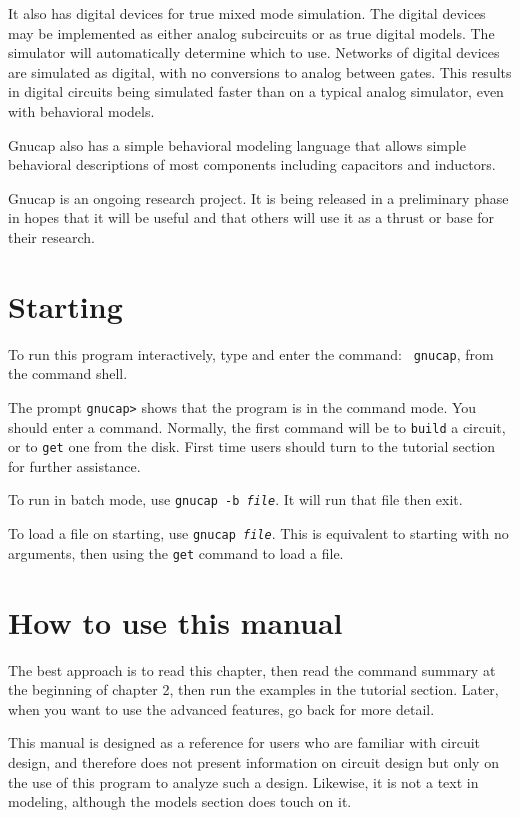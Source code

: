 It also has digital devices for true mixed mode simulation.  The digital
devices may be implemented as either analog subcircuits or as true digital
models.  The simulator will automatically determine which to use.  Networks
of digital devices are simulated as digital, with no conversions to analog
between gates.  This results in digital circuits being simulated faster than
on a typical analog simulator, even with behavioral models.

Gnucap also has a simple behavioral modeling language that allows simple
behavioral descriptions of most components including capacitors and
inductors.

Gnucap is an ongoing research project.  It is being released in a preliminary
phase in hopes that it will be useful and that others will use it as a
thrust or base for their research.
\section{Starting}

To run this program interactively, type and enter the command: {\tt
gnucap}, from the command shell.

The prompt {\tt gnucap>} shows that the program is in the command mode.  You
should enter a command.  Normally, the first command will be to {\tt build} a
circuit, or to {\tt get} one from the disk.  First time users should turn to
the tutorial section for further assistance. 

To run in batch mode, use {\tt gnucap -b {\em file}}.  It will run that
file then exit.

To load a file on starting, use {\tt gnucap {\em file}}.  This is
equivalent to starting with no arguments, then using the {\tt get}
command to load a file.
\section{How to use this manual}

The best approach is to read this chapter, then read the command summary at
the beginning of chapter 2, then run the examples in the tutorial section.
Later, when you want to use the advanced features, go back for more detail.

This manual is designed as a reference for users who are familiar with
circuit design, and therefore does not present information on circuit design
but only on the use of this program to analyze such a design.  Likewise, it
is not a text in modeling, although the models section does touch on it.

